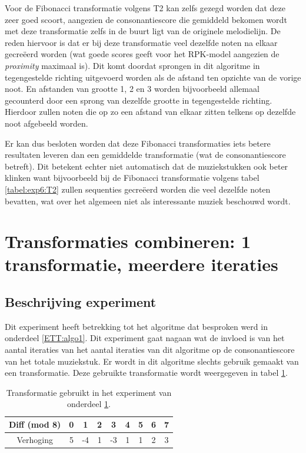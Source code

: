 Voor de Fibonacci transformatie volgens T2 kan zelfs gezegd worden dat deze zeer goed scoort, aangezien de consonantiescore die gemiddeld bekomen wordt met deze transformatie zelfs in de buurt ligt van de originele melodielijn. De reden hiervoor is dat er bij deze transformatie veel dezelfde noten na elkaar gecre\"eerd worden (wat goede scores geeft voor het RPK-model aangezien de \textit{proximity} maximaal is). Dit komt doordat sprongen in dit algoritme in tegengestelde richting uitgevoerd worden als de afstand ten opzichte van de vorige noot. En afstanden van grootte 1, 2 en 3 worden bijvoorbeeld allemaal gecounterd door een sprong van dezelfde grootte in tegengestelde richting. Hierdoor zullen noten die op zo een afstand van elkaar zitten telkens op dezelfde noot afgebeeld worden.

Er kan dus besloten worden dat deze Fibonacci transformaties iets betere resultaten leveren dan een gemiddelde transformatie (wat de consonantiescore betreft). Dit betekent echter niet automatisch dat de muziekstukken ook beter klinken want bijvoorbeeld bij de Fibonacci transformatie volgens tabel \ref{tabel:exp6:T2} zullen sequenties gecre\"eerd worden die veel dezelfde noten bevatten, wat over het algemeen niet als interessante muziek beschouwd wordt.

\section{Transformaties combineren: 1 transformatie, meerdere iteraties}
\label{experiment:1}
\subsection{Beschrijving experiment}
Dit experiment heeft betrekking tot het algoritme dat besproken werd in onderdeel \ref{ETT:algo1}. Dit experiment gaat nagaan wat de invloed is van het aantal iteraties van het aantal iteraties van dit algoritme op de consonantiescore van het totale muziekstuk. Er wordt in dit algoritme slechts gebruik gemaakt van een transformatie. Deze gebruikte transformatie wordt weergegeven in tabel \ref{tabel:exp1}.

\begin{table}
  \centering
  \begin{tabular}{c | c c c c c c c c }
    Diff (mod 8) & 0 & 1 & 2 & 3 & 4 & 5 & 6 & 7 \\
    \hline
    \hline
    Verhoging & 5 & -4 & 1 & -3 & 1 & 1 & 2 & 3 \\
  \end{tabular}
  \caption{Transformatie gebruikt in het experiment van onderdeel \ref{experiment:1}.}
  \label{tabel:exp1}
\end{table}

